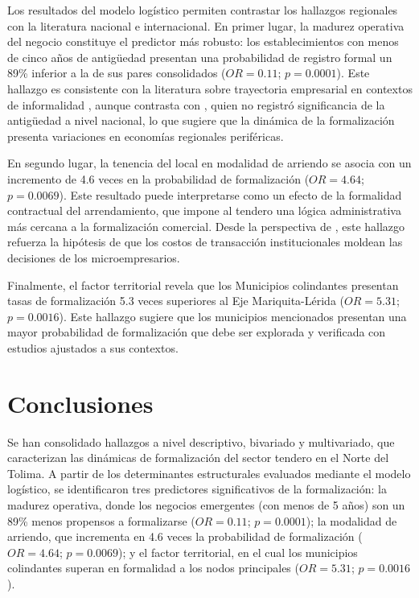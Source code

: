 \documentclass[11pt,a4paper]{article}
\begin{document}
\par
Los resultados del modelo logístico permiten contrastar los hallazgos regionales con la literatura nacional e internacional. En primer lugar, la madurez operativa del negocio constituye el predictor más robusto: los establecimientos con menos de cinco años de antigüedad presentan una probabilidad de registro formal un 89\% inferior a la de sus pares consolidados ($OR = 0.11$; $p = 0.0001$). Este hallazgo es consistente con la literatura sobre trayectoria empresarial en contextos de informalidad \citep{ruiloba2024}, aunque contrasta con \citet{mesa2023}, quien no registró significancia de la antigüedad a nivel nacional, lo que sugiere que la dinámica de la formalización presenta variaciones en economías regionales periféricas.

\par
En segundo lugar, la tenencia del local en modalidad de arriendo se asocia con un incremento de 4.6 veces en la probabilidad de formalización ($OR = 4.64$; $p = 0.0069$). Este resultado puede interpretarse como un efecto de la formalidad contractual del arrendamiento, que impone al tendero una lógica administrativa más cercana a la formalización comercial. Desde la perspectiva de \citet{fernandez2020}, este hallazgo refuerza la hipótesis de que los costos de transacción institucionales moldean las decisiones de los microempresarios.

\par
Finalmente, el factor territorial revela que los Municipios colindantes presentan tasas de formalización 5.3 veces superiores al Eje Mariquita-Lérida ($OR = 5.31$; $p = 0.0016$). Este hallazgo sugiere que los municipios mencionados presentan una mayor probabilidad de formalización que debe ser explorada y verificada con estudios ajustados a sus contextos.

\newpage
\section{Conclusiones}

\par
Se han consolidado hallazgos a nivel descriptivo, bivariado y multivariado, que caracterizan las dinámicas de formalización del sector tendero en el Norte del Tolima. A partir de los determinantes estructurales evaluados mediante el modelo logístico, se identificaron tres predictores significativos de la formalización: la madurez operativa, donde los negocios emergentes (con menos de 5 años) son un 89\% menos propensos a formalizarse ($OR = 0.11$; $p = 0.0001$); la modalidad de arriendo, que incrementa en 4.6 veces la probabilidad de formalización ($OR = 4.64$; $p = 0.0069$); y el factor territorial, en el cual los municipios colindantes superan en formalidad a los nodos principales ($OR = 5.31$; $p = 0.0016$).
\end{document}

